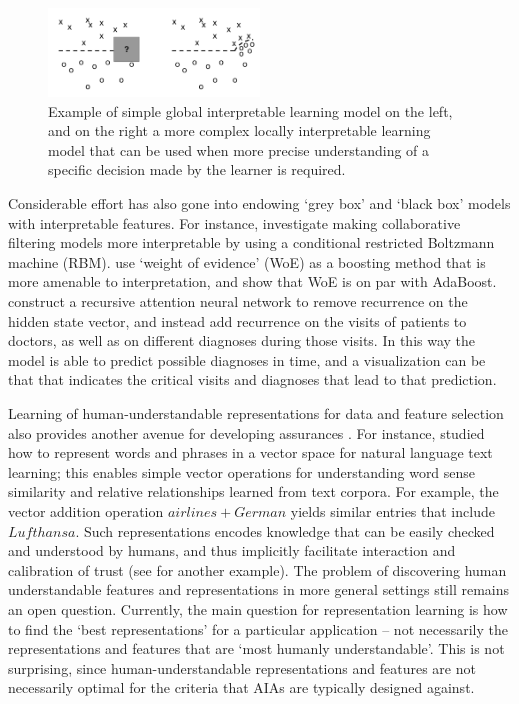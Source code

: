 \begin{figure}[htbp]
    \centering
    \includegraphics[width=0.5\textwidth]{Figures/global_local}
    \caption{Example of simple global interpretable learning model on the left, and on the right a more complex locally interpretable learning model that can be used when more precise understanding of a specific decision made by the learner is required. }
    \label{fig:ruping}
\end{figure}

Considerable effort has also gone into endowing `grey box' and `black box' models with interpretable features. 
For instance, \citet{Abdollahi2016-vn} investigate making collaborative filtering models more interpretable by using a conditional restricted Boltzmann machine (RBM). \citet{Ridgeway1998-lv} use `weight of evidence' (WoE) as a boosting method that is more amenable to interpretation, and show that WoE is on par with AdaBoost. \citet{Choi2016-by} construct a recursive attention neural network to remove recurrence on the hidden state vector, and instead add recurrence on the visits of patients to doctors, as well as on different diagnoses during those visits. In this way the model is able to predict possible diagnoses in time, and a visualization can be that that indicates the critical visits and diagnoses that lead to that prediction.

Learning of human-understandable representations for data and feature selection also provides another avenue for developing assurances  \cite{Bengio2013-uv, Guyon2003-fj}. For instance, \citet{Mikolov2013-lt} studied how to represent words and phrases in a vector space for natural language text learning; this enables simple vector operations for understanding word sense similarity and relative relationships learned from text corpora. For example, the vector addition operation $airlines+German$ yields similar entries that include $Lufthansa$. Such representations encodes knowledge that can be easily checked and understood by humans, and thus implicitly facilitate interaction and calibration of trust (see \cite{Haury2011-zi} for another example). The problem of discovering human understandable features and representations in more general settings still remains an open question. Currently, the main question for representation learning is how to find the `best representations' for a particular application -- not necessarily the representations and features that are `most humanly understandable'. This is not surprising, since human-understandable representations and features are not necessarily optimal for the criteria that AIAs are typically designed against. 

